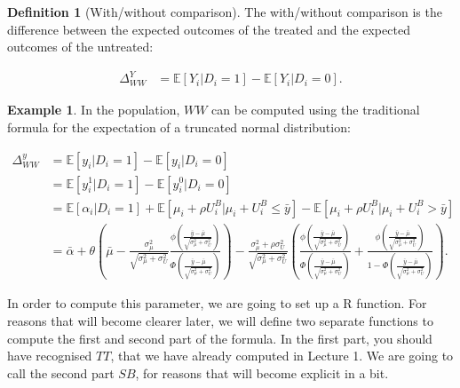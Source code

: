 \documentclass[
]{book}
\newcommand{\esp}[1]{\mathbb{E}[ #1 ]}
\theoremstyle{definition}
\newtheorem{definition}{Definition}[chapter]
\theoremstyle{definition}
\newtheorem{example}{Example}[chapter]
\theoremstyle{definition}
\theoremstyle{definition}
\theoremstyle{remark}
\begin{document}
\begin{definition}[With/without comparison]
\protect\hypertarget{def:unnamed-chunk-14}{}{\label{def:unnamed-chunk-14} \iffalse (With/without comparison) \fi{} }The with/without comparison is the difference between the expected outcomes of the treated and the expected outcomes of the untreated:

\begin{align*}
\Delta^Y_{WW} & =  \esp{Y_i|D_i=1}-\esp{Y_i|D_i=0}.
\end{align*}
\end{definition}

\begin{example}
\protect\hypertarget{exm:unnamed-chunk-15}{}{\label{exm:unnamed-chunk-15} }In the population, \(WW\) can be computed using the traditional formula for the expectation of a truncated normal distribution:

\begin{align*}
\Delta^y_{WW} & = \esp{y_i|D_i=1}-\esp{y_i|D_i=0} \\
              & = \esp{y_i^1|D_i=1}-\esp{y^0_i|D_i=0} \\
              & = \esp{\alpha_i|D_i=1}+\esp{\mu_i+\rho U_i^B|\mu_i+U_i^B\leq\bar{y}}-\esp{\mu_i+\rho U_i^B|\mu_i+U_i^B>\bar{y}} \\
              & = \bar{\alpha}+\theta\left(\bar{\mu}-\frac{\sigma^2_{\mu}}{\sqrt{\sigma^2_{\mu}+\sigma^2_{U}}}\frac{\phi\left(\frac{\bar{y}-\bar{\mu}}{\sqrt{\sigma^2_{\mu}+\sigma^2_{U}}}\right)}{\Phi\left(\frac{\bar{y}-\bar{\mu}}{\sqrt{\sigma^2_{\mu}+\sigma^2_{U}}}\right)}\right)  
              -\frac{\sigma^2_{\mu}+\rho\sigma^2_{U}}{\sqrt{\sigma^2_{\mu}+\sigma^2_{U}}}\left(\frac{\phi\left(\frac{\bar{y}-\bar{\mu}}{\sqrt{\sigma^2_{\mu}+\sigma^2_{U}}}\right)}{\Phi\left(\frac{\bar{y}-\bar{\mu}}{\sqrt{\sigma^2_{\mu}+\sigma^2_{U}}}\right)}+\frac{\phi\left(\frac{\bar{y}-\bar{\mu}}{\sqrt{\sigma^2_{\mu}+\sigma^2_{U}}}\right)}{1-\Phi\left(\frac{\bar{y}-\bar{\mu}}{\sqrt{\sigma^2_{\mu}+\sigma^2_{U}}}\right)}\right).
\end{align*}
\end{example}
In order to compute this parameter, we are going to set up a R function.
For reasons that will become clearer later, we will define two separate functions to compute the first and second part of the formula.
In the first part, you should have recognised \(TT\), that we have already computed in Lecture 1.
We are going to call the second part \(SB\), for reasons that will become explicit in a bit.
\end{document}
